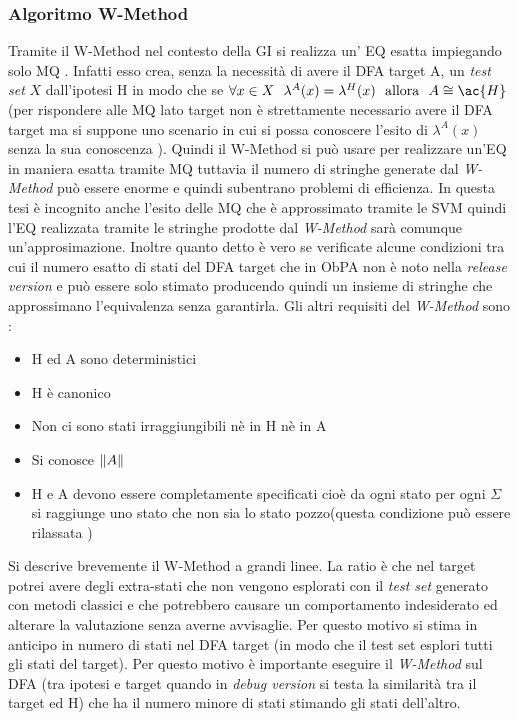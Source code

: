\subsubsection{Algoritmo W-Method}
Tramite il W-Method nel contesto della \ac{GI} si realizza un' \ac{EQ} esatta impiegando solo \ac{MQ} \cite{Balanescu03}. Infatti esso crea, senza la necessità di avere il \ac{DFA} target A,  un \textit{test set}  $X$ dall'ipotesi \ac{H} in modo che se $\forall x \in X \:\:\: \lambda^{A}(x) = \lambda^{H}(x) \:\:\: \text{allora} \:\:\: A \cong \ac{H}$  (per rispondere alle \ac{MQ} lato target non è strettamente necessario avere il \ac{DFA} target ma si suppone uno scenario in cui si possa conoscere l'esito di $\lambda^{A}(x)$ senza la sua conoscenza ). Quindi il W-Method si può usare per realizzare un'\ac{EQ} in maniera esatta tramite \ac{MQ} tuttavia il numero di stringhe generate dal \textit{W-Method} può essere enorme e quindi subentrano problemi di efficienza. In questa tesi è incognito anche l'esito delle \ac{MQ} che è approssimato tramite le \ac{SVM} quindi l'\ac{EQ} realizzata tramite le stringhe prodotte dal \textit{W-Method} sarà comunque un'approsimazione. Inoltre quanto detto è vero se verificate alcune condizioni tra cui il numero esatto di stati del \ac{DFA} target   che in \ac{ObPA} non è noto nella \textit{release version} e può essere solo stimato producendo quindi un insieme di stringhe che approssimano l'equivalenza senza garantirla. Gli altri requisiti del \textit{W-Method} sono \cite{Balanescu03}:
\begin{itemize}
\item \ac{H} ed A sono deterministici
\item \ac{H} è canonico
\item Non ci sono stati irraggiungibili nè in \ac{H} nè in A
\item Si conosce $\lVert A\rVert$
\item \ac{H} e A devono essere completamente specificati cioè da ogni stato per ogni $\Sigma$ si raggiunge uno stato che non sia lo stato pozzo(questa condizione può essere rilassata \cite{Balanescu03})
\end{itemize}
Si descrive brevemente il W-Method a grandi linee.   La ratio è che nel target potrei avere degli extra-stati che non vengono esplorati con il \textit{test set} generato con metodi classici e che potrebbero causare un comportamento indesiderato ed alterare la valutazione senza averne avvisaglie. Per questo motivo si stima in anticipo in numero di stati nel \ac{DFA} target (in modo che il test set esplori tutti gli stati del target). Per questo motivo è importante eseguire il \textit{W-Method} sul \ac{DFA} (tra ipotesi e target quando in \textit{debug version} si testa la similarità tra il target ed \ac{H}) che ha il numero minore di stati stimando gli stati dell'altro.\\

